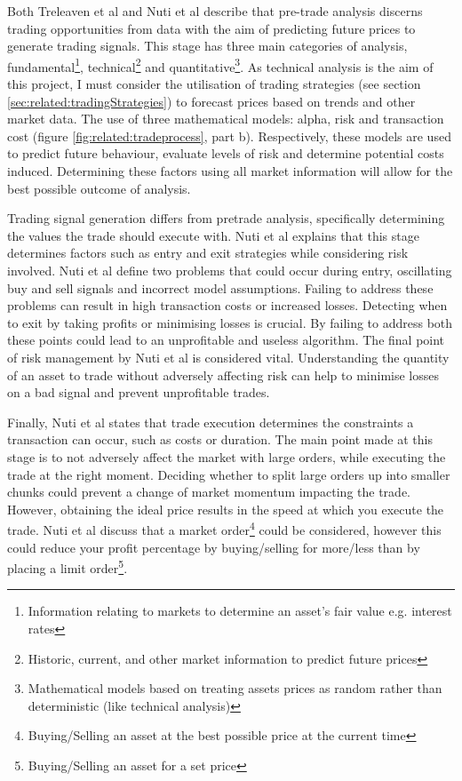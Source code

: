 Both Treleaven et al \cite{ART:Treleaven:2013} and Nuti et al \cite{ART:Nuti:2011} describe that pre-trade analysis discerns trading opportunities from data with the aim of predicting future prices to generate trading signals. This stage has three main categories of analysis, fundamental\footnote{Information relating to markets to determine an asset's fair value e.g. interest rates}, technical\footnote{Historic, current, and other market information to predict future prices} and quantitative\footnote{Mathematical models based on treating assets prices as random rather than deterministic (like technical analysis)}. As technical analysis is the aim of this project, I must consider the utilisation of trading strategies (see section \ref{sec:related:tradingStrategies}) to forecast prices based on trends and other market data. The use of three mathematical models: alpha, risk and transaction cost (figure \ref{fig:related:tradeprocess}, part b). Respectively, these models are used to predict future behaviour, evaluate levels of risk and determine potential costs induced. Determining these factors using all market information will allow for the best possible outcome of analysis. 

Trading signal generation differs from pretrade analysis, specifically determining the values the trade should execute with. Nuti et al \cite{ART:Nuti:2011} explains that this stage determines factors such as entry and exit strategies while considering risk involved. Nuti et al define two problems that could occur during entry, oscillating buy and sell signals and incorrect model assumptions. Failing to address these problems can result in high transaction costs or increased losses. Detecting when to exit by taking profits or minimising losses is crucial. By failing to address both these points could lead to an unprofitable and useless algorithm. The final point of risk management by Nuti et al is considered vital. Understanding the quantity of an asset to trade without adversely affecting risk can help to minimise losses on a bad signal and prevent unprofitable trades.

Finally, Nuti et al \cite{ART:Nuti:2011} states that trade execution determines the constraints a transaction can occur, such as costs or duration. The main point made at this stage is to not adversely affect the market with large orders, while executing the trade at the right moment. Deciding whether to split large orders up into smaller chunks could prevent a change of market momentum impacting the trade. However, obtaining the ideal price results in the speed at which you execute the trade. Nuti et al discuss that a market order\footnote{Buying/Selling an asset at the best possible price at the current time} could be considered, however this could reduce your profit percentage by buying/selling for more/less than by placing a limit order\footnote{Buying/Selling an asset for a set price}.

